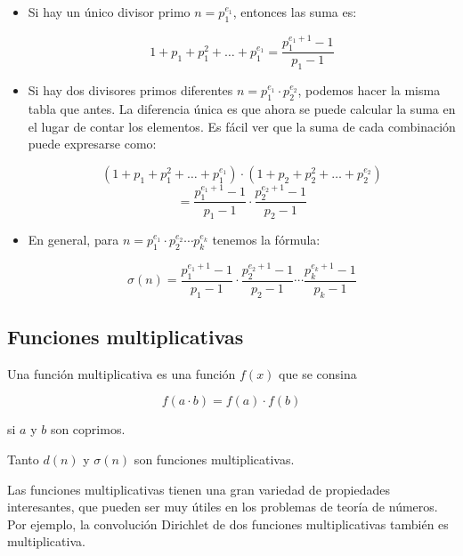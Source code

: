 \begin{itemize}
	\item Si hay un único divisor primo $n = p_1^{e_1}$, entonces las suma es:
	
	$$1 + p_1 + p_1^2 + \dots + p_1^{e_1} = \frac{p_1^{e_1 + 1} - 1}{p_1 - 1}$$
	
	\item Si hay dos divisores primos diferentes  $n = p_1^{e_1} \cdot p_2^{e_2}$, podemos hacer la misma tabla que antes. La diferencia única es que ahora se puede calcular la suma en el lugar de contar los elementos. Es fácil ver que la suma de cada combinación puede expresarse como:
	
	$$\left(1 + p_1 + p_1^2 + \dots + p_1^{e_1}\right) \cdot \left(1 + p_2 + p_2^2 + \dots + p_2^{e_2}\right)$$
	$$ = \frac{p_1^{e_1 + 1} - 1}{p_1 - 1} \cdot \frac{p_2^{e_2 + 1} - 1}{p_2 - 1}$$
	
	\item En general, para $n = p_1^{e_1} \cdot p_2^{e_2} \cdots p_k^{e_k}$ tenemos la fórmula:
	
	$$\sigma(n) = \frac{p_1^{e_1 + 1} - 1}{p_1 - 1} \cdot \frac{p_2^{e_2 + 1} - 1}{p_2 - 1} \cdots \frac{p_k^{e_k + 1} - 1}{p_k - 1}$$
	
\end{itemize}

\subsection{Funciones multiplicativas}

Una función multiplicativa es una función $f (x)$ que se consina

$$f(a \cdot b) = f(a) \cdot f(b)$$

si $a$ y $b$ son coprimos.

Tanto $d(n)$ y $\sigma (n)$ son funciones multiplicativas.

Las funciones multiplicativas tienen una gran variedad de propiedades interesantes, que pueden ser muy útiles en los problemas de teoría de números. Por ejemplo, la convolución Dirichlet de dos funciones multiplicativas también es multiplicativa.